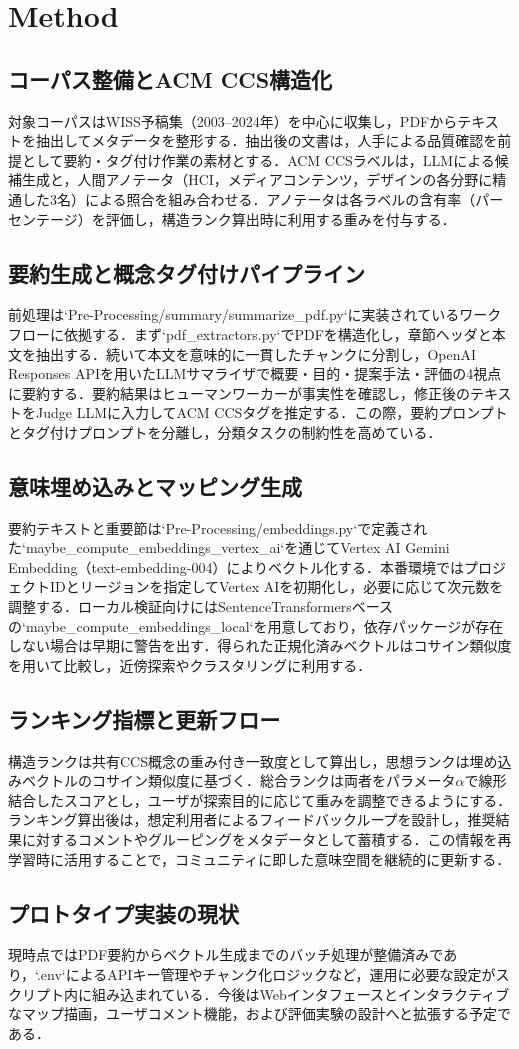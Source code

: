 \documentclass[twoside]{wiss}
\begin{document}
\section{Method}

\subsection{コーパス整備とACM CCS構造化}
対象コーパスはWISS予稿集（2003--2024年）を中心に収集し，PDFからテキストを抽出してメタデータを整形する．抽出後の文書は，人手による品質確認を前提として要約・タグ付け作業の素材とする．ACM CCSラベルは，LLMによる候補生成と，人間アノテータ（HCI，メディアコンテンツ，デザインの各分野に精通した3名）による照合を組み合わせる．アノテータは各ラベルの含有率（パーセンテージ）を評価し，構造ランク算出時に利用する重みを付与する．

\subsection{要約生成と概念タグ付けパイプライン}
前処理は`Pre-Processing/summary/summarize_pdf.py`に実装されているワークフローに依拠する．まず`pdf_extractors.py`でPDFを構造化し，章節ヘッダと本文を抽出する．続いて本文を意味的に一貫したチャンクに分割し，OpenAI Responses APIを用いたLLMサマライザで概要・目的・提案手法・評価の4視点に要約する．要約結果はヒューマンワーカーが事実性を確認し，修正後のテキストをJudge LLMに入力してACM CCSタグを推定する．この際，要約プロンプトとタグ付けプロンプトを分離し，分類タスクの制約性を高めている．

\subsection{意味埋め込みとマッピング生成}
要約テキストと重要節は`Pre-Processing/embeddings.py`で定義された`maybe_compute_embeddings_vertex_ai`を通じてVertex AI Gemini Embedding（text-embedding-004）によりベクトル化する．本番環境ではプロジェクトIDとリージョンを指定してVertex AIを初期化し，必要に応じて次元数を調整する．ローカル検証向けにはSentenceTransformersベースの`maybe_compute_embeddings_local`を用意しており，依存パッケージが存在しない場合は早期に警告を出す．得られた正規化済みベクトルはコサイン類似度を用いて比較し，近傍探索やクラスタリングに利用する．

\subsection{ランキング指標と更新フロー}
構造ランクは共有CCS概念の重み付き一致度として算出し，思想ランクは埋め込みベクトルのコサイン類似度に基づく．総合ランクは両者をパラメータ$\alpha$で線形結合したスコアとし，ユーザが探索目的に応じて重みを調整できるようにする．ランキング算出後は，想定利用者によるフィードバックループを設計し，推奨結果に対するコメントやグルーピングをメタデータとして蓄積する．この情報を再学習時に活用することで，コミュニティに即した意味空間を継続的に更新する．

\subsection{プロトタイプ実装の現状}
現時点ではPDF要約からベクトル生成までのバッチ処理が整備済みであり，`.env`によるAPIキー管理やチャンク化ロジックなど，運用に必要な設定がスクリプト内に組み込まれている．今後はWebインタフェースとインタラクティブなマップ描画，ユーザコメント機能，および評価実験の設計へと拡張する予定である．
\end{document}
